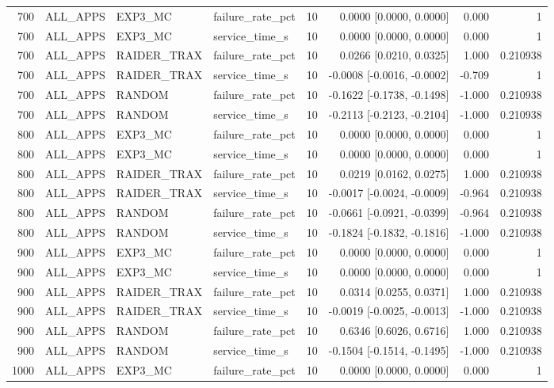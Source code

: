 \begin{tabular}{rlllrrrr}
700 & ALL\_APPS & EXP3\_MC & failure\_rate\_pct & 10 & 0.0000 [0.0000, 0.0000] & 0.000 & 1 \\
700 & ALL\_APPS & EXP3\_MC & service\_time\_s & 10 & 0.0000 [0.0000, 0.0000] & 0.000 & 1 \\
700 & ALL\_APPS & RAIDER\_TRAX & failure\_rate\_pct & 10 & 0.0266 [0.0210, 0.0325] & 1.000 & 0.210938 \\
700 & ALL\_APPS & RAIDER\_TRAX & service\_time\_s & 10 & -0.0008 [-0.0016, -0.0002] & -0.709 & 1 \\
700 & ALL\_APPS & RANDOM & failure\_rate\_pct & 10 & -0.1622 [-0.1738, -0.1498] & -1.000 & 0.210938 \\
700 & ALL\_APPS & RANDOM & service\_time\_s & 10 & -0.2113 [-0.2123, -0.2104] & -1.000 & 0.210938 \\
800 & ALL\_APPS & EXP3\_MC & failure\_rate\_pct & 10 & 0.0000 [0.0000, 0.0000] & 0.000 & 1 \\
800 & ALL\_APPS & EXP3\_MC & service\_time\_s & 10 & 0.0000 [0.0000, 0.0000] & 0.000 & 1 \\
800 & ALL\_APPS & RAIDER\_TRAX & failure\_rate\_pct & 10 & 0.0219 [0.0162, 0.0275] & 1.000 & 0.210938 \\
800 & ALL\_APPS & RAIDER\_TRAX & service\_time\_s & 10 & -0.0017 [-0.0024, -0.0009] & -0.964 & 0.210938 \\
800 & ALL\_APPS & RANDOM & failure\_rate\_pct & 10 & -0.0661 [-0.0921, -0.0399] & -0.964 & 0.210938 \\
800 & ALL\_APPS & RANDOM & service\_time\_s & 10 & -0.1824 [-0.1832, -0.1816] & -1.000 & 0.210938 \\
900 & ALL\_APPS & EXP3\_MC & failure\_rate\_pct & 10 & 0.0000 [0.0000, 0.0000] & 0.000 & 1 \\
900 & ALL\_APPS & EXP3\_MC & service\_time\_s & 10 & 0.0000 [0.0000, 0.0000] & 0.000 & 1 \\
900 & ALL\_APPS & RAIDER\_TRAX & failure\_rate\_pct & 10 & 0.0314 [0.0255, 0.0371] & 1.000 & 0.210938 \\
900 & ALL\_APPS & RAIDER\_TRAX & service\_time\_s & 10 & -0.0019 [-0.0025, -0.0013] & -1.000 & 0.210938 \\
900 & ALL\_APPS & RANDOM & failure\_rate\_pct & 10 & 0.6346 [0.6026, 0.6716] & 1.000 & 0.210938 \\
900 & ALL\_APPS & RANDOM & service\_time\_s & 10 & -0.1504 [-0.1514, -0.1495] & -1.000 & 0.210938 \\
1000 & ALL\_APPS & EXP3\_MC & failure\_rate\_pct & 10 & 0.0000 [0.0000, 0.0000] & 0.000 & 1 \\

\end{tabular}
